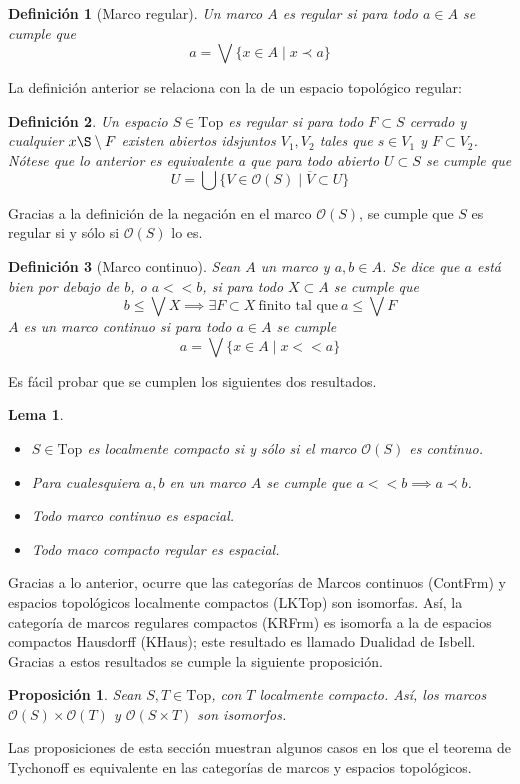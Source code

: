 \documentclass[12pt,letterpaper,titlepage]{article}
\newtheorem*{defn}{Definición}
\newtheorem{lemma}{Lema}
\newtheorem*{prop}{Proposición}
\theoremstyle{definition}
\newcommand\Sup{\bigvee}
\newcommand\<{\langle}
\renewcommand\>{\rangle}
\newcommand{\Top}{\mathrm{Top}}
\begin{document}
\begin{defn}[Marco regular]
Un marco $A$ es regular si para todo $a\in A$ se cumple que
$$a=\Sup\{x\in A \mid x\prec a\}$$
\end{defn}
La definición anterior se relaciona con la de un espacio topológico regular:
\begin{defn}
    Un espacio $S\in\Top$ es regular si para todo $F\subset S$ cerrado y cualquier $x\S\setminus F$ existen abiertos idsjuntos $V_1, V_2$ tales que $s\in V_1$ y $F\subset V_2$.
    Nótese que lo anterior es equivalente a que para todo abierto $U\subset S$ se cumple que
    $$U=\bigcup \{V \in \mathcal{O}(S) \mid \overline{V}\subset U\}$$
\end{defn}
Gracias a la definición de la negación en el marco $\mathcal{O}(S)$, se cumple que $S$ es regular si y sólo si $\mathcal{O}(S)$ lo es.
\begin{defn}[Marco continuo]
    Sean $A$ un marco y $a,b\in A$. Se dice que $a$ está bien por debajo de $b$, o $a<<b$, si para todo $X\subset A$ se cumple que
    $$b\leq \Sup X\implies \exists F\subset X \ \text{finito tal que} \ a\leq \Sup F$$
    $A$ es un marco continuo si para todo $a\in A$ se cumple
    $$a=\Sup\{x\in A\mid x<<a\}$$
\end{defn}
Es fácil probar que se cumplen los siguientes dos resultados.
\begin{lemma}
\begin{itemize}
    \item $S\in\Top$ es localmente compacto si y sólo si el marco $\mathcal{O}(S)$ es continuo.
    \item Para cualesquiera $a,b$ en un marco $A$ se cumple que $a<<b\implies a\prec b$.
    \item Todo marco continuo es espacial.
    \item Todo maco compacto regular es espacial.
\end{itemize}
\end{lemma}
Gracias a lo anterior, ocurre que las categorías de Marcos continuos (ContFrm) y espacios topológicos localmente compactos (LKTop) son isomorfas. Así, la categoría de marcos regulares compactos (KRFrm) es isomorfa a la de espacios compactos Hausdorff (KHaus); este resultado es llamado Dualidad de Isbell.
Gracias a estos resultados se cumple la siguiente proposición.
\begin{prop}
Sean $S,T\in\Top$, con $T$ localmente compacto. Así, los marcos $\mathcal{O}(S)\times \mathcal{O}(T)$ y $\mathcal{O}(S\times T)$ son isomorfos.
\end{prop}
Las proposiciones de esta sección muestran algunos casos en los que el teorema de Tychonoff es equivalente en las categorías de marcos y espacios topológicos.
\end{document}
